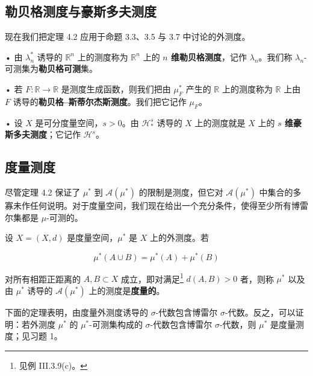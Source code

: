 \subsection*{勒贝格测度与豪斯多夫测度}

现在我们把定理 4.2 应用于命题 3.3、3.5 与 3.7 中讨论的外测度。

• 由 $ \lambda_n^* $ 诱导的 $ \mathbb{R}^n $ 上的测度称为 $ \mathbb{R}^n $ 上的 \textbf{$ n $ 维勒贝格测度}，记作 $ \lambda_n $。我们称 $ \lambda_n $-可测集为\textbf{勒贝格可测}集。

• 若 $ F\colon \mathbb{R} \to \mathbb{R} $ 是测度生成函数，则我们把由 $ \mu_F^* $ 产生的 $ \mathbb{R} $ 上的测度称为 $ \mathbb{R} $ 上由 $ F $ 诱导的\textbf{勒贝格–斯蒂尔杰斯测度}。我们把它记作 $ \mu_F $。

• 设 $ X $ 是可分度量空间，$ s > 0 $。由 $ \mathcal{H}_*^s $ 诱导的 $ X $ 上的测度就是 $ X $ 上的 \textbf{$ s $ 维豪斯多夫测度}；它记作 $ \mathcal{H}^s $。

\subsection*{度量测度}

尽管定理 4.2 保证了 $ \mu^* $ 到 $ \mathcal{A}(\mu^*) $ 的限制是测度，但它对 $ \mathcal{A}(\mu^*) $ 中集合的多寡未作任何说明。对于度量空间，我们现在给出一个充分条件，使得至少所有博雷尔集都是 $ \mu $-可测的。

设 $ X = (X, d) $ 是度量空间，$ \mu^* $ 是 $ X $ 上的外测度。若

\[
\mu^*(A \cup B) = \mu^*(A) + \mu^*(B)
\]

对所有相距正距离的 $ A, B \subset X $ 成立，即对满足\footnote{见例 III.3.9(c)。} $ d(A, B) > 0 $ 者，则称 $ \mu^* $ 以及由 $ \mu^* $ 诱导的 $ \mathcal{A}(\mu^*) $ 上的测度是\textbf{度量的}。

下面的定理表明，由度量外测度诱导的 $ \sigma $-代数包含博雷尔 $ \sigma $-代数。反之，可以证明：若外测度 $ \mu^* $ 的 $ \mu^* $-可测集构成的 $ \sigma $-代数包含博雷尔 $ \sigma $-代数，则 $ \mu^* $ 是度量测度；见习题 1。

